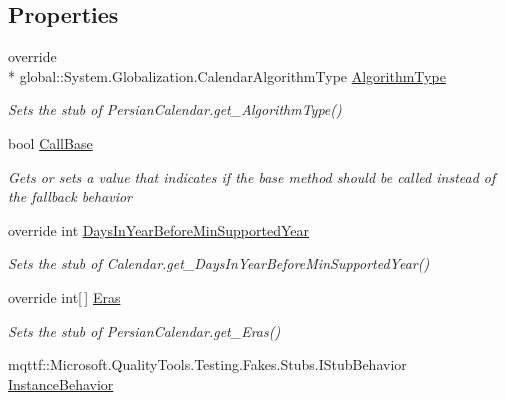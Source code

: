 \subsection*{Properties}
\begin{DoxyCompactItemize}
\item 
override \\*
global\-::\-System.\-Globalization.\-Calendar\-Algorithm\-Type \hyperlink{class_system_1_1_globalization_1_1_fakes_1_1_stub_persian_calendar_ae570d1a09a84624bbeaf50902ebb9730}{Algorithm\-Type}
\begin{DoxyCompactList}\small\item\em Sets the stub of Persian\-Calendar.\-get\-\_\-\-Algorithm\-Type()\end{DoxyCompactList}\item 
bool \hyperlink{class_system_1_1_globalization_1_1_fakes_1_1_stub_persian_calendar_a5c025e8236739c8e0554dcb0c5af3103}{Call\-Base}
\begin{DoxyCompactList}\small\item\em Gets or sets a value that indicates if the base method should be called instead of the fallback behavior\end{DoxyCompactList}\item 
override int \hyperlink{class_system_1_1_globalization_1_1_fakes_1_1_stub_persian_calendar_a5fb2c9d534b699561e66a95c5f51d6f1}{Days\-In\-Year\-Before\-Min\-Supported\-Year}
\begin{DoxyCompactList}\small\item\em Sets the stub of Calendar.\-get\-\_\-\-Days\-In\-Year\-Before\-Min\-Supported\-Year()\end{DoxyCompactList}\item 
override int\mbox{[}$\,$\mbox{]} \hyperlink{class_system_1_1_globalization_1_1_fakes_1_1_stub_persian_calendar_a9e0e981cd09e636351052b1ee40db505}{Eras}
\begin{DoxyCompactList}\small\item\em Sets the stub of Persian\-Calendar.\-get\-\_\-\-Eras()\end{DoxyCompactList}\item 
mqttf\-::\-Microsoft.\-Quality\-Tools.\-Testing.\-Fakes.\-Stubs.\-I\-Stub\-Behavior \hyperlink{class_system_1_1_globalization_1_1_fakes_1_1_stub_persian_calendar_aec684a12a91eb7e60a6051625647ad68}{Instance\-Behavior}

\end{DoxyCompactItemize}
